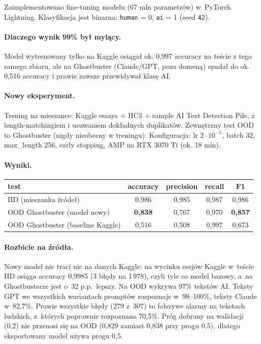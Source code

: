 Zaimplementowano fine-tuning modelu 
(67 mln parametrów) w~PyTorch Lightning. Klasyfikacja jest binarna:
\texttt{human} = 0, \texttt{ai} = 1 (seed \texttt{42}).

\paragraph{Dlaczego wynik 99\% był mylący.}
Model wytrenowany tylko na Kaggle osiągał ok. 0,997 accuracy na teście z tego
samego zbioru, ale na Ghostbuster (Claude/GPT, poza domeną) spadał do
ok. 0,516 accuracy i prawie zawsze przewidywał klasę AI.

\paragraph{Nowy eksperyment.}
Trening na mieszance: Kaggle essays + HC3 + sample AI Text Detection Pile,
z length-matchingiem i usuwaniem dokładnych duplikatów. Zewnętrzny test OOD to
Ghostbuster (nigdy nieobecny w treningu). Konfiguracja: lr \(2 \cdot 10^{-5}\),
batch 32, max\_length 256, early stopping, AMP na RTX 3070 Ti (ok. 18 min).

\paragraph{Wyniki.}
\begin{center}
\begin{tabular}{|l|c|c|c|c|}
\hline
test & accuracy & precision & recall & F1 \\
\hline
IID (mieszanka źródeł) & 0,986 & 0,985 & 0,987 & 0,986 \\
OOD Ghostbuster (model nowy) & \textbf{0,838} & 0,767 & 0,970 & \textbf{0,857} \\
OOD Ghostbuster (baseline Kaggle) & 0,516 & 0,508 & 0,997 & 0,673 \\
\hline
\end{tabular}
\end{center}

\paragraph{Rozbicie na źródła.}
Nowy model nie traci nic na danych Kaggle: na wycinku esejów Kaggle w~teście IID
osiąga accuracy 0,9985 (3 błędy na 1\,978), czyli tyle co model bazowy, a~na
Ghostbusterze jest o~32 p.p.\ lepszy. Na OOD wykrywa 97\% tekstów AI. Teksty
GPT we wszystkich wariantach promptów rozpoznaje w~98--100\%, teksty Claude
w~82,7\%. Prawie wszystkie błędy (279 z~307) to fałszywe alarmy na tekstach
ludzkich, z~których poprawnie rozpoznano 70,5\%. Próg dobrany na walidacji
(0,2) nie przenosi się na OOD (0,829 zamiast 0,838 przy progu 0,5), dlatego
eksportowany model używa progu 0,5.

